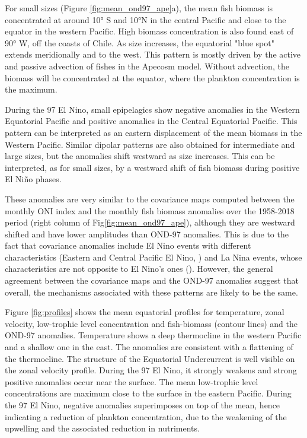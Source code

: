For small sizes (Figure \ref{fig:mean_ond97_ape}a), the mean fish biomass is concentrated at around 10° S and 10°N in the central Pacific and close to the equator in the western Pacific. High biomass concentration is also found east of 90° W, off the coasts of Chile. As size increases, the equatorial "blue spot" extends meridionally and to the west. This pattern is mostly driven by the active and passive advection of fishes in the Apecosm model. Without advection, the biomass will be concentrated at the equator, where the plankton concentration is the maximum.

During the 97 El Nino, small epipelagics show negative anomalies in the Western Equatorial Pacific and positive anomalies in the Central Equatorial Pacific. This pattern can be interpreted as an eastern displacement of the mean biomass in the Western Pacific. Similar dipolar patterns are also obtained for intermediate and large sizes, but the anomalies shift westward as size increases. This can be interpreted, as for small sizes, by a westward shift of fish biomass during positive El Niño phases.

These anomalies are very similar to the covariance maps computed between the monthly ONI index and the monthly fish biomass anomalies over the 1958-2018 period (right column of Fig\ref{fig:mean_ond97_ape}), although they are westward shifted and have lower amplitudes than OND-97 anomalies. This is due to the fact that covariance anomalies include El Nino events with different characteristics (Eastern and Central Pacific El Nino, )  and La Nina events, whose characteristics are not opposite to El Nino's ones (). However, the general agreement between the covariance maps and the OND-97 anomalies suggest that overall, the mechanisms associated with these patterns are likely to be the same.

Figure \ref{fig:profiles} shows the mean equatorial profiles for temperature, zonal velocity, low-trophic level concentration and fish-biomass (contour lines) and the OND-97 anomalies. Temperature shows a deep thermocline in the western Pacific and a shallow one in the east. The anomalies are consistent with a flattening of the thermocline. The structure of the Equatorial Undercurrent is well visible on the zonal velocity profile. During the 97 El Nino, it strongly weakens and strong positive anomalies occur near the surface. The mean low-trophic level concentrations are maximum close to the surface in the eastern Pacific. During the 97 El Nino, negative anomalies superimposes on top of the mean, hence indicating a reduction of plankton concentration, due to the weakening of the upwelling and the associated reduction in nutriments.

